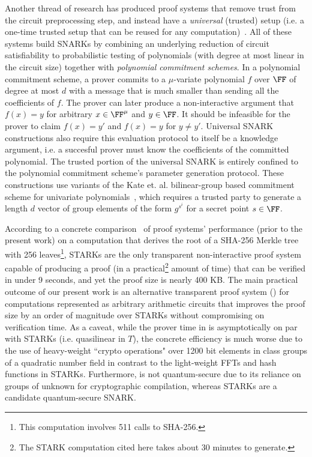 Another thread of research has produced proof systems that remove trust from the circuit preprocessing step, and instead have a \emph{universal} (trusted) setup (i.e. a one-time trusted setup that can be reused for any computation)~\cite{Sonic,Libra,Spartan,Plonk}. All of these systems build SNARKs by combining an underlying reduction of circuit satisfiability to probabilistic testing of polynomials (with degree at most linear in the circuit size) together with \emph{polynomial commitment schemes}. In a polynomial commitment scheme, a prover commits to a $\mu$-variate polynomial $f$ over $\FF$ of degree at most $d$ with a message that is much smaller than sending all the coefficients of $f$. The prover can later produce a non-interactive argument that $f(x) = y$ for arbitrary $x \in \FF^\mu$ and $y \in \FF$. It should be infeasible for the prover to claim $f(x) = y'$ and $f(x) = y$ for $y \neq y'$. Universal SNARK constructions also require this evaluation protocol to itself be a knowledge argument, i.e. a succesful prover must know the coefficients of the committed polynomial. The trusted portion of the universal SNARK is entirely confined to the polynomial commitment scheme's parameter generation protocol. These constructions use variants of the Kate et. al. bilinear-group based commitment scheme for univariate polynomials~\cite{AC:KatZavGol10}, which requires a trusted party to generate a length $d$ vector of group elements of the form $g^{s^i}$ for a secret point $s \in \FF$. 

According to a concrete comparison~\cite{Libra} of proof systems' performance (prior to the present work) on a computation that derives the root of a SHA-256 Merkle tree with 256 leaves\footnote{This computation involves 511 calls to SHA-256.}, STARKs are the only transparent non-interactive proof system capable of producing a proof (in a practical\footnote{The STARK computation cited here takes about 30 minutes to generate.}  amount of time) that can be verified in under 9 seconds, and yet the proof size is nearly 400 KB. The main practical outcome of our present work is an alternative transparent proof system () for computations represented as arbitrary arithmetic circuits that improves the proof size by an order of magnitude over STARKs without compromising on verification time. As a caveat, while the prover time in  is asymptotically on par with STARKs (i.e. quasilinear in $T$), the concrete efficiency is much worse due to the use of heavy-weight ``crypto operations" over 1200 bit elements in class groups of a quadratic number field in contrast to the light-weight FFTs and hash functions in STARKs. Furthermore,  is not quantum-secure due to its reliance on groups of unknown for cryptographic compilation, whereas STARKs are a candidate quantum-secure SNARK. 

